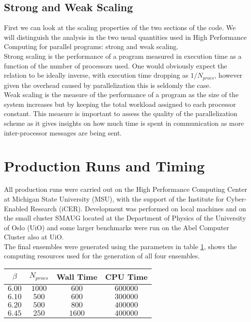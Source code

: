 \subsection{Strong and Weak Scaling}
First we can look at the scaling properties of the two sections of the code. We will distinguish the analysis in the two usual quantities used in High Performance Computing for parallel programs: strong and weak scaling. \\
Strong scaling is the performance of a program measured in execution time as a function of the number of processors used. One would obviously expect the relation to be ideally inverse, with execution time dropping as $1/N_{procs}$, however given the overhead caused by parallelization this is seldomly the case. \\
Weak scaling is the measure of the performance of a program as the size of the system increases but by keeping the total workload assigned to each processor constant. This measure is important to assess the quality of the parallelization scheme as it gives insights on how much time is spent in communication as more inter-processor messages are being sent.


\section{Production Runs and Timing}
All production runs were carried out on the High Performance Computing Center at Michigan State University (MSU), with the support of the Institute for Cyber-Enabled Research (iCER). Development was performed on local machines and on the small cluster SMAUG located at the Department of Physics of the University of Oslo (UiO) and some larger benchmarks were run on the Abel Computer Cluster also at UiO.\\
The final ensembles were generated using the parameters in table \cref{runs:times}, shows the computing resources used for the generation of all four ensembles. 
\begin{table}[!htb]
    \begin{center}
    \begin{tabular}{cccc}
        $\beta$ & $N_{procs}$ & Wall Time & CPU Time\\\hline
        $6.00$ & $1000$ & $600$ & $600000$\\
        $6.10$ & $500$ & $600$ & $300000$\\
        $6.20$ & $500$ & $800$ & $400000$\\
        $6.45$ & $250$ & $1600$ & $400000$
    \end{tabular}
    \label{runs:times} 
    \end{center}
\end{table}